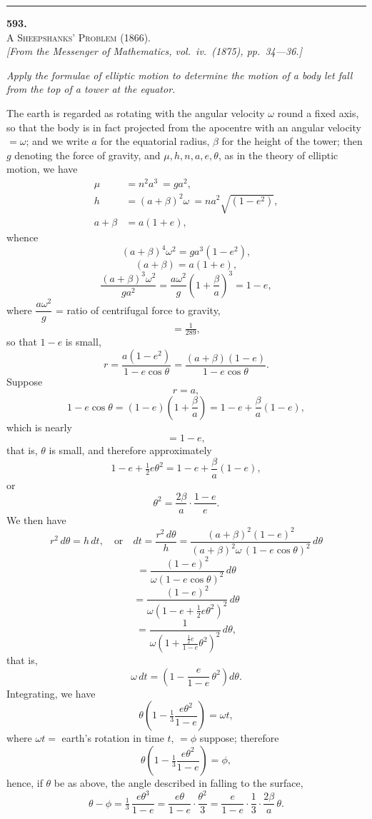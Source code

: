\documentclass[11pt]{article}
\begin{document}
\bigskip
\hrule
\bigskip


\begin{center}
{\large\textbf{593.}}\\[4pt]
{\scshape A Sheepshanks' Problem} (1866).\\[4pt]
\textit{[From the \textit{Messenger of Mathematics}, vol.\ iv.\ (1875), pp.\ 34---36.]}
\end{center}

\medskip

\textit{Apply the formulae of elliptic motion to determine the motion of a body let
fall from the top of a tower at the equator.}

\medskip
The earth is regarded as rotating with the angular velocity $\omega$ round a fixed axis,
so that the body is in fact projected from the apocentre with an angular velocity
$=\omega$; and we write $a$ for the equatorial radius, $\beta$ for the height of the
tower; then $g$ denoting the force of gravity, and $\mu,h,n,a,e,\theta$, as in the theory
of elliptic motion, we have
\begin{align*}
\mu &= n^{2}a^{3}\ =ga^{2},\\
h &= (a+\beta)^{2}\omega\ =na^{2}\sqrt{(1-e^{2})},\\
a+\beta &= a(1+e),
\end{align*}
whence
\[
(a+\beta)^{4}\omega^{2}=ga^{3}(1-e^{2}),
\]
\[
(a+\beta)=a(1+e),
\]
\[
\frac{(a+\beta)^{3}\omega^{2}}{ga^{2}}=\frac{a\omega^{2}}{g}\!\left(1+\frac{\beta}{a}\right)^{3}=1-e,
\]
where $\dfrac{a\omega^{2}}{g}$ = ratio of centrifugal force to gravity,
\[
=\tfrac{1}{289},
\]
so that $1-e$ is small,
\[
r=\frac{a(1-e^{2})}{1-e\cos\theta}=\frac{(a+\beta)(1-e)}{1-e\cos\theta}.
\]
Suppose
\[
r=a,
\]
\[
1-e\cos\theta=(1-e)\!\left(1+\frac{\beta}{a}\right)=1-e+\frac{\beta}{a}(1-e),
\]
which is nearly
\[
=1-e,
\]
that is, $\theta$ is small, and therefore approximately
\[
1-e+\tfrac{1}{2}e\theta^{2}=1-e+\frac{\beta}{a}(1-e),
\]
or
\[
\theta^{2}=\frac{2\beta}{a}\cdot\frac{1-e}{e}.
\]
We then have
\[
r^{2}\,d\theta=h\,dt,\quad\text{or}\quad dt=\frac{r^{2}\,d\theta}{h}=\frac{(a+\beta)^{2}(1-e)^{2}}{(a+\beta)^{2}\omega\,(1-e\cos\theta)^{2}}\,d\theta
\]
\[
=\frac{(1-e)^{2}}{\omega(1-e\cos\theta)^{2}}\,d\theta
\]
\[
=\frac{(1-e)^{2}}{\omega(1-e+\tfrac{1}{2}e\theta^{2})^{2}}\,d\theta
\]
\[
=\frac{1}{\omega\!\left(1+\tfrac{\frac{1}{2}e}{1-e}\theta^{2}\right)^{2}}\,d\theta,
\]
that is,
\[
\omega\,dt=\!\left(1-\frac{e}{1-e}\,\theta^{2}\right)d\theta.
\]
Integrating, we have
\[
\theta\!\left(1-\tfrac{1}{3}\frac{e\theta^{2}}{1-e}\right)=\omega t,
\]
where $\omega t=$ earth's rotation in time $t$, $=\phi$ suppose; therefore
\[
\theta\!\left(1-\tfrac{1}{3}\frac{e\theta^{2}}{1-e}\right)=\phi,
\]
hence, if $\theta$ be as above, the angle described in falling to the surface,
\[
\theta-\phi=\tfrac{1}{3}\,\frac{e\theta^{3}}{1-e}=\frac{e\theta}{1-e}\cdot\frac{\theta^{2}}{3}=\frac{e}{1-e}\cdot\frac{1}{3}\cdot\frac{2\beta}{a}\,\theta.
\]
\end{document}
